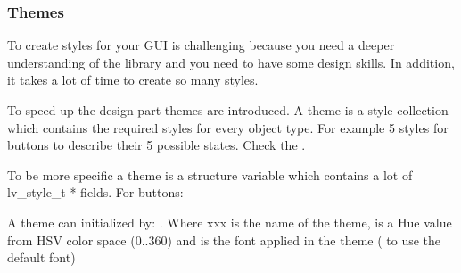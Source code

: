 \documentclass[letterpaper,10pt,english]{sphinxmanual}
\begin{document}
\begin{sphinxVerbatim}[commandchars=\\\{\}]
    
      
                              
\end{sphinxVerbatim}


\subsubsection{Themes}
\label{\detokenize{overview/styles:themes}}
To create styles for your GUI is challenging because you need a deeper understanding of the library and you need to have some design skills. In addition, it takes a lot of time to create so many styles.

To speed up the design part themes are introduced. A theme is a style collection which contains the required styles for every object type. For example 5 styles for buttons to describe their 5 possible states.
Check the .

To be more specific a theme is a structure variable which contains a lot of lv\_style\_t * fields. For buttons:

%
\begin{sphinxVerbatim}[commandchars=\\\{\}]
       
        
   
    
       
\end{sphinxVerbatim}

A theme can initialized by: . Where xxx is the name of the theme,  is a Hue value from HSV color space (0..360) and  is the font applied in the theme ( to use the  default font)
\end{document}
